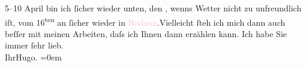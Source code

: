                   5–10 April bin ich ſicher wieder unten, den \label{K_L02167_3v}\label{K_L02167_3h}, wenns Wetter nicht zu unfreundlich iſt, vom
                     16\textsuperscript{ten} an ſicher wieder in \textcolor{pink}{Rodaun}{}\ledrightnote{\textcolor{pink}{Rodaun}}.\hspace*{1.5em}Vielleicht ſteh ich mich dann auch beſſer  mit meinen Arbeiten, daſs ich Ihnen dann erzählen
               kann.\pend
           \pstart
           Ich habe Sie immer ſehr lieb.{\\[\baselineskip]}Ihr\spacefill\mbox{Hugo.}\pend
           \leftskip=0em{}\endnumbering{}  
      